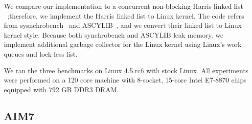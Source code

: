 \ifkor
We compare our  implementation to a concurrent non-blocking Harris
linked list ~\cite{Harris2001Lockfree};therefore, we implement the Harris linked
list to Linux kernel.
The code refers from sysnchrobench~\cite{Gramoli2015Synchrobench} and
ASCYLIB~\cite{David2015ASYNCHRONIZED}, and we convert their linked list to
Linux kernel style.
Because both synchrobench and ASCYLIB leak memory, we implement additional
garbage collector for the Linux kernel using Linux's work queues and lock-less
list.
\else
\fi



\ifkor
We ran the three benchmarks on Linux 4.5.rc6 with stock Linux. 
All experiments were performed on a 120 core machine with 8-socket, 15-core
Intel E7-8870 chips equipped with 792 GB DDR3 DRAM.
\else
\fi

\subsection{AIM7}



